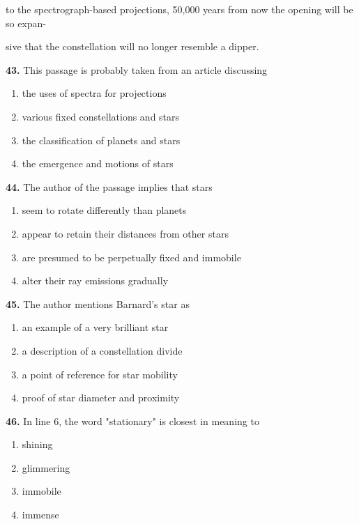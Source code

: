\documentclass[12pt]{article}
\begin{document}
to the spectrograph-based projections, 50,000 years from now the opening will be so expan-\par
sive that the constellation will no longer resemble a dipper.\par
\endgroup
\medskip
\noindent\textbf{43.} This passage is probably taken from an article discussing
\begin{enumerate}[label=(\Alph*),leftmargin=*,itemsep=0.2em]
\item the uses of spectra for projections
\item various fixed constellations and stars
\item the classification of planets and stars
\item the emergence and motions of stars
\end{enumerate}
\par
\vspace{0.25\baselineskip}
\noindent\textbf{44.} The author of the passage implies that stars
\begin{enumerate}[label=(\Alph*),leftmargin=*,itemsep=0.2em]
\item seem to rotate differently than planets
\item appear to retain their distances from other stars
\item are presumed to be perpetually fixed and immobile
\item alter their ray emissions gradually
\end{enumerate}
\par
\vspace{0.25\baselineskip}
\noindent\textbf{45.} The author mentions Barnard's star as
\begin{enumerate}[label=(\Alph*),leftmargin=*,itemsep=0.2em]
\item an example of a very brilliant star
\item a description of a constellation divide
\item a point of reference for star mobility
\item proof of star diameter and proximity
\end{enumerate}
\par
\vspace{0.25\baselineskip}
\noindent\textbf{46.} In line 6, the word "stationary" is closest in meaning to
\begin{enumerate}[label=(\Alph*),leftmargin=*,itemsep=0.2em]
\item shining
\item glimmering
\item immobile
\item immense
\end{enumerate}
\end{document}
